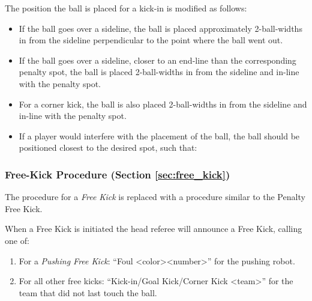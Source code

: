 The position the ball is placed for a kick-in is modified as follows:
\begin{itemize}
    \item If the ball goes over a sideline, the ball is placed approximately 2-ball-widths in from the sideline perpendicular to the point where the ball went out.
    \item If the ball goes over a sideline, closer to an end-line than the corresponding penalty spot, the ball is placed 2-ball-widths in from the sideline and in-line with the penalty spot.
    \item For a corner kick, the ball is also placed 2-ball-widths in from the sideline and in-line with the penalty spot.
    \item If a player would interfere with the placement of the ball, the ball should be positioned closest to the desired spot, such that:
\end{itemize}

\subsubsection{Free-Kick Procedure (Section \ref{sec:free_kick})}

The procedure for a \emph{Free Kick} is replaced with a procedure similar to the Penalty Free Kick.

When a Free Kick is initiated the head referee will announce a Free Kick, calling one of:
\begin{enumerate}
  \item For a \textit{Pushing Free Kick}: ``Foul \textless color\textgreater \textless number\textgreater'' for the pushing robot.
  \item For all other free kicks: ``Kick-in/Goal Kick/Corner Kick \textless team\textgreater'' for the team that did not last touch the ball.
\end{enumerate}

